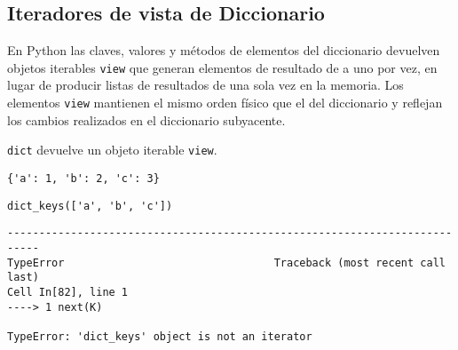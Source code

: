 \subsection{Iteradores de vista de Diccionario}

En Python las claves, valores y métodos de elementos del diccionario
devuelven objetos iterables \texttt{view} que generan elementos de
resultado de a uno por vez, en lugar de producir listas de resultados de
una sola vez en la memoria. Los elementos \texttt{view} mantienen el
mismo orden físico que el del diccionario y reflejan los cambios
realizados en el diccionario subyacente.
\\

\begin{code} \texttt{dict} devuelve un objeto iterable \texttt{view}.
\begin{Shaded}
\begin{Highlighting}[]
\OperatorTok{=} \OperatorTok{=}\OperatorTok{=}\OperatorTok{=}\NormalTok{)}
\end{Highlighting}
\end{Shaded}

\begin{verbatim}
{'a': 1, 'b': 2, 'c': 3}
\end{verbatim}

\begin{Shaded}
\begin{Highlighting}[]
\OperatorTok{=}
\end{Highlighting}
\end{Shaded}

\begin{verbatim}
dict_keys(['a', 'b', 'c'])
\end{verbatim}

\begin{Shaded}
\begin{Highlighting}[]
\end{Highlighting}
\end{Shaded}

\begin{verbatim}
---------------------------------------------------------------------------
TypeError                                 Traceback (most recent call last)
Cell In[82], line 1
----> 1 next(K)

TypeError: 'dict_keys' object is not an iterator
\end{verbatim}


\end{code}
